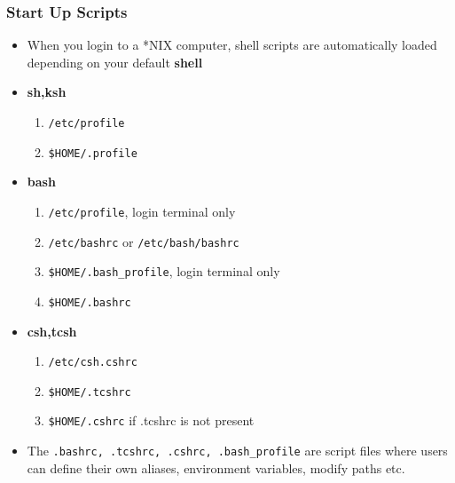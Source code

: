 \documentclass[10pt,t]{beamer}
\begin{document}
\begin{frame}
  \frametitle{\small Start Up Scripts}
  \begin{itemize}
    \item When you login to a *NIX computer, shell scripts are automatically loaded depending on your default \textbf{\color{lubrown}shell}
    \item \textbf{\color{lubrown}sh,ksh}
    \begin{enumerate}
        \item \texttt{\color{blue}/etc/profile}
        \item \texttt{\color{blue}\$HOME/.profile}
    \end{enumerate}
    \item \textbf{\color{lubrown}bash}
    \begin{enumerate}
        \item \texttt{\color{blue}/etc/profile}, login terminal only
        \item \texttt{\color{blue}/etc/bashrc} or \texttt{\color{blue}/etc/bash/bashrc}
        \item \texttt{\color{blue}\$HOME/.bash\_profile}, login terminal only
        \item \texttt{\color{blue}\$HOME/.bashrc}
    \end{enumerate}
    \item \textbf{\color{lubrown}csh,tcsh}
    \begin{enumerate}
        \item \texttt{\color{blue}/etc/csh.cshrc}
        \item \texttt{\color{blue}\$HOME/.tcshrc}
        \item \texttt{\color{blue}\$HOME/.cshrc} if .tcshrc is not present
    \end{enumerate}
    \item The \texttt{\color{blue}.bashrc, .tcshrc, .cshrc, .bash\_profile} are script files where users can define their own aliases, environment variables, modify paths etc.
  \end{itemize}
\end{frame}
\end{document}
